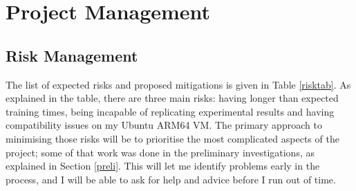 
\chapter{Project Management} %

\label{AppendixC} %


\section{Risk Management}
\label{risman}

The list of expected risks and proposed mitigations is given in Table \ref{risktab}. As explained in the table, there are three main risks: having longer than expected training times, being incapable of replicating experimental results and having compatibility issues on my Ubuntu ARM64 VM. The primary approach to minimising those risks will be to prioritise the most complicated aspects of the project; some of that work was done in the preliminary investigations, as explained in Section \ref{preli}. This will let me identify problems early in the process, and I will be able to ask for help and advice before I run out of time.

